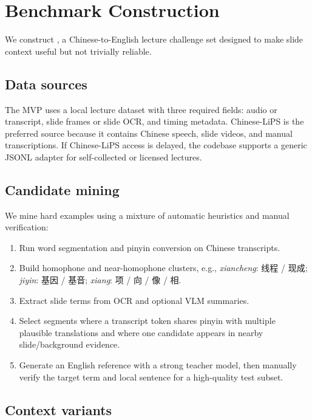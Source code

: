 \section{Benchmark Construction}
\label{sec:benchmark}

We construct \datasetname, a Chinese-to-English lecture challenge set designed to make slide context useful but not trivially reliable.

\subsection{Data sources}

The MVP uses a local lecture dataset with three required fields: audio or transcript, slide frames or slide OCR, and timing metadata.  Chinese-LiPS is the preferred source because it contains Chinese speech, slide videos, and manual transcriptions.  If Chinese-LiPS access is delayed, the codebase supports a generic JSONL adapter for self-collected or licensed lectures.

\subsection{Candidate mining}

We mine hard examples using a mixture of automatic heuristics and manual verification:
\begin{enumerate}[leftmargin=*]
    \item Run word segmentation and pinyin conversion on Chinese transcripts.
    \item Build homophone and near-homophone clusters, e.g., \emph{xiancheng}: 线程 / 现成; \emph{jiyin}: 基因 / 基音; \emph{xiang}: 项 / 向 / 像 / 相.
    \item Extract slide terms from OCR and optional VLM summaries.
    \item Select segments where a transcript token shares pinyin with multiple plausible translations and where one candidate appears in nearby slide/background evidence.
    \item Generate an English reference with a strong teacher model, then manually verify the target term and local sentence for a high-quality test subset.
\end{enumerate}

\subsection{Context variants}

